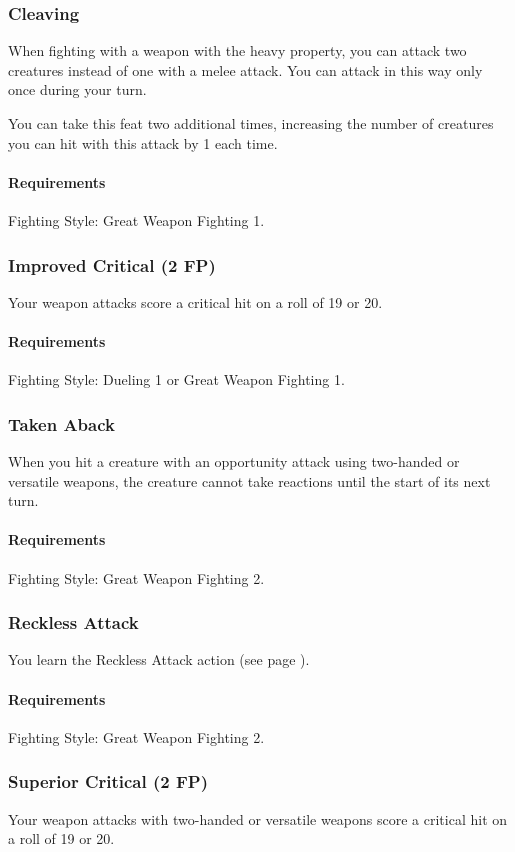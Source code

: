 \subsubsection{Cleaving} \label{feat::cleaving}
    When fighting with a weapon with the heavy property, you can attack two creatures instead of one with a melee attack.
    You can attack in this way only once during your turn.

    You can take this feat two additional times, increasing the number of creatures you can hit with this attack by 1 each time.
    \paragraph{Requirements} Fighting Style: Great Weapon Fighting 1.
\subsubsection{Improved Critical (2 FP)} \label{feat::improvedcritical}
    Your weapon attacks score a critical hit on a roll of 19 or 20.
    \paragraph{Requirements} Fighting Style: Dueling 1 or Great Weapon Fighting 1.
\subsubsection{Taken Aback} \label{feat::takenaback}
    When you hit a creature with an opportunity attack using two-handed or versatile weapons, the creature cannot take reactions until the start of its next turn.
    \paragraph{Requirements} Fighting Style: Great Weapon Fighting 2.
\subsubsection{Reckless Attack} \label{feat::recklessattack}
    You learn the Reckless Attack action (see page \pageref{act::recklessattack}).
    \paragraph{Requirements} Fighting Style: Great Weapon Fighting 2.
\subsubsection{Superior Critical (2 FP)} \label{feat::superiorcritical}
    Your weapon attacks with two-handed or versatile weapons score a critical hit on a roll of 19 or 20.

